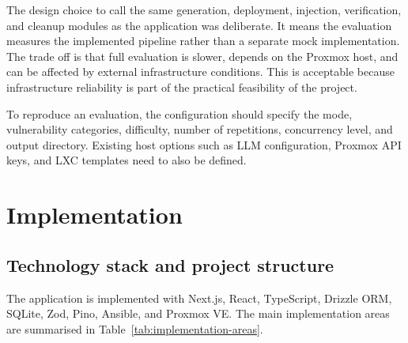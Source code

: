 The design choice to call the same generation, deployment, injection, verification, and cleanup modules as the application was deliberate. It means the evaluation measures the implemented pipeline rather than a separate mock implementation. The trade off is that full evaluation is slower, depends on the Proxmox host, and can be affected by external infrastructure conditions. This is acceptable because infrastructure reliability is part of the practical feasibility of the project.

To reproduce an evaluation, the configuration should specify the mode, vulnerability categories, difficulty, number of repetitions, concurrency level, and output directory. Existing host options such as LLM configuration, Proxmox API keys, and LXC templates need to also be defined.

\section{Implementation}\label{sec:impl}

\subsection{Technology stack and project structure}\label{sec:tech-stack}

The application is implemented with Next.js, React, TypeScript, Drizzle ORM, SQLite, Zod, Pino, Ansible, and Proxmox VE. The main implementation areas are summarised in Table~\ref{tab:implementation-areas}.


